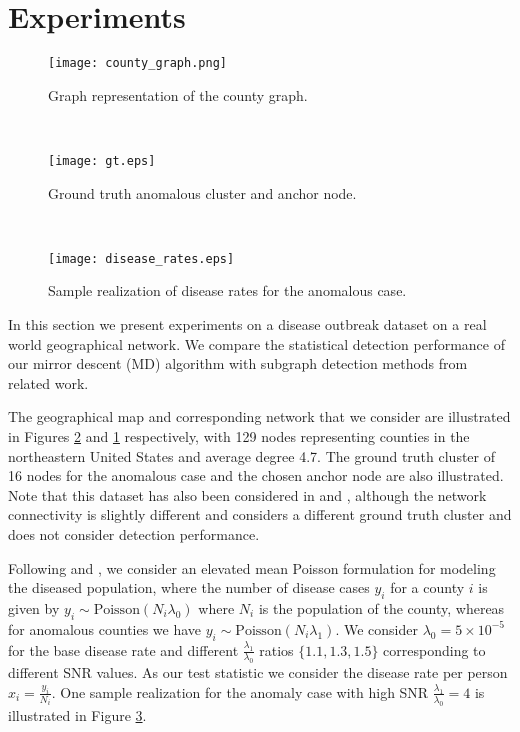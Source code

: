 \documentclass{article}
\begin{document}
\section{Experiments}

\begin{figure*}[t]
    \centering
    \begin{subfigure}[t]{0.3\textwidth}
        \centering
        \texttt{[image: county\_graph.png]}
        \caption{Graph representation of the county graph. }
    \label{fig:county_graph}
    \end{subfigure}%
    ~ 
    \begin{subfigure}[t]{0.3\textwidth}
        \centering
        \texttt{[image: gt.eps]}
        \caption{Ground truth anomalous cluster and anchor node.}
    \label{fig:county}
    \end{subfigure}%
    ~ 
    \begin{subfigure}[t]{0.3\textwidth}
        \centering
        \texttt{[image: disease\_rates.eps]}
        \caption{Sample realization of disease rates for the anomalous case.}
    \label{fig:county_sample}
    \end{subfigure}
    \caption{Disease outbreak detection in northeastern United States counties.}
\end{figure*}

In this section we present experiments on a disease outbreak dataset on a real world geographical network. We compare the statistical detection performance of our mirror descent (MD) algorithm with subgraph detection methods from related work.

The geographical map and corresponding network that we consider are illustrated in Figures \ref{fig:county} and \ref{fig:county_graph} respectively, with 129 nodes representing counties in the northeastern United States and average degree 4.7. The ground truth cluster of 16 nodes for the anomalous case and the chosen anchor node are also illustrated. Note that this dataset has also been considered in \cite{aistats14} and \cite{nips14}, although the network connectivity is slightly different and \cite{aistats14} considers a different ground truth cluster and does not consider detection performance.

Following \cite{disease} and \cite{aistats14,nips14}, we consider an elevated mean Poisson formulation for modeling the diseased population, where the number of disease cases $y_i$ for a county $i$ is given by $y_i \sim \mathrm{Poisson}(N_i \lambda_0)$ where $N_i$ is the population of the county, whereas for anomalous counties we have $y_i \sim \mathrm{Poisson}(N_i \lambda_1)$. We consider $\lambda_0 = 5 \times 10^{-5}$ for the base disease rate and different $\frac{\lambda_1}{\lambda_0}$ ratios $\{1.1, 1.3, 1.5\}$ corresponding to different SNR values. As our test statistic we consider the disease rate per person $x_i = \frac{y_i}{N_i}$. One sample realization for the anomaly case with high SNR $\frac{\lambda_1}{\lambda_0} = 4$ is illustrated in Figure \ref{fig:county_sample}.
\end{document}
